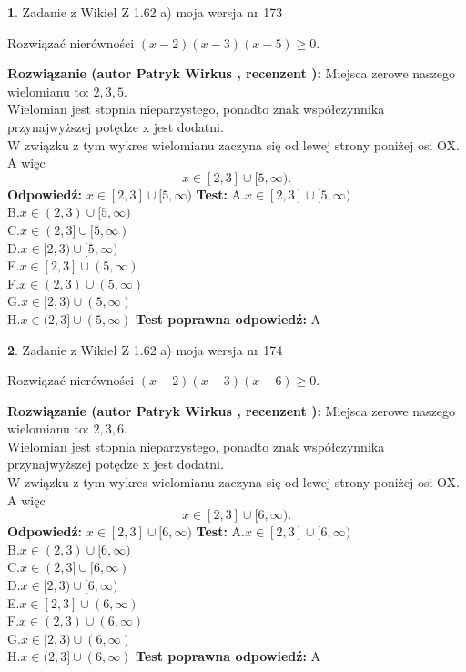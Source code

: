 \documentclass[12pt, a4paper]{article}
\theoremstyle{definition} %
\newtheorem{zad}{}
\newcommand{\zadStart}[1]{\begin{zad}#1\newline}
\newcommand{\zadStop}{\end{zad}}
\newcommand{\rozwStart}[2]{\noindent \textbf{Rozwiązanie (autor #1 , recenzent #2): }\newline}
\newcommand{\rozwStop}{\newline}
\newcommand{\odpStart}{\noindent \textbf{Odpowiedź:}\newline}
\newcommand{\odpStop}{\newline}
\newcommand{\testStart}{\noindent \textbf{Test:}\newline}
\newcommand{\testStop}{\newline}
\newcommand{\kluczStart}{\noindent \textbf{Test poprawna odpowiedź:}\newline}
\newcommand{\kluczStop}{\newline}
\begin{document}
\zadStart{Zadanie z Wikieł Z 1.62 a) moja wersja nr 173}

Rozwiązać nierówności $(x-2)(x-3)(x-5)\ge0$.
\zadStop
\rozwStart{Patryk Wirkus}{}
Miejsca zerowe naszego wielomianu to: $2, 3, 5$.\\
Wielomian jest stopnia nieparzystego, ponadto znak współczynnika przy\linebreak najwyższej potędze x jest dodatni.\\ W związku z tym wykres wielomianu zaczyna się od lewej strony poniżej osi OX. A więc $$x \in [2,3] \cup [5,\infty).$$
\rozwStop
\odpStart
$x \in [2,3] \cup [5,\infty)$
\odpStop
\testStart
A.$x \in [2,3] \cup [5,\infty)$\\
B.$x \in (2,3) \cup [5,\infty)$\\
C.$x \in (2,3] \cup [5,\infty)$\\
D.$x \in [2,3) \cup [5,\infty)$\\
E.$x \in [2,3] \cup (5,\infty)$\\
F.$x \in (2,3) \cup (5,\infty)$\\
G.$x \in [2,3) \cup (5,\infty)$\\
H.$x \in (2,3] \cup (5,\infty)$
\testStop
\kluczStart
A
\kluczStop



\zadStart{Zadanie z Wikieł Z 1.62 a) moja wersja nr 174}

Rozwiązać nierówności $(x-2)(x-3)(x-6)\ge0$.
\zadStop
\rozwStart{Patryk Wirkus}{}
Miejsca zerowe naszego wielomianu to: $2, 3, 6$.\\
Wielomian jest stopnia nieparzystego, ponadto znak współczynnika przy\linebreak najwyższej potędze x jest dodatni.\\ W związku z tym wykres wielomianu zaczyna się od lewej strony poniżej osi OX. A więc $$x \in [2,3] \cup [6,\infty).$$
\rozwStop
\odpStart
$x \in [2,3] \cup [6,\infty)$
\odpStop
\testStart
A.$x \in [2,3] \cup [6,\infty)$\\
B.$x \in (2,3) \cup [6,\infty)$\\
C.$x \in (2,3] \cup [6,\infty)$\\
D.$x \in [2,3) \cup [6,\infty)$\\
E.$x \in [2,3] \cup (6,\infty)$\\
F.$x \in (2,3) \cup (6,\infty)$\\
G.$x \in [2,3) \cup (6,\infty)$\\
H.$x \in (2,3] \cup (6,\infty)$
\testStop
\kluczStart
A
\kluczStop
\end{document}
